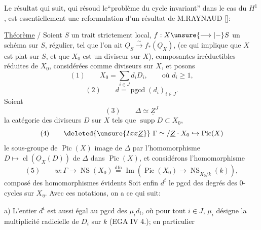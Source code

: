 

Le résultat qui suit, qui résoud le``problème du cycle invariant'' dans le cas du $H^1$, est essentiellement une reformulation d'un résultat de M.RAYNAUD [\quad]:
\margin{$\times$}

\uline{Théorème} / Soient $S$ un trait strictement local, $f:X\unsure{\longrightarrow|\mathbin{-}}S$ un schéma  sur $S$, régulier, tel que l'on ait $\underline{O}_S\xrightarrow{\sim}f_*(\underline{O}_X)$, (ce qui implique que $X$ est plat sur $S$, et que $X_0$ est un diviseur sur $X$),  composantes irréductibles réduites de $X_0$, considérées comme diviseurs sur $X$, et posons \unsure{$\times$}
\[
(1)\qquad X_0=\sum_{i\in J}d_iD_i,\qquad\text{où }d_i\geq1,
\]
\[
(2)\qquad d=\operatorname{pgcd}(d_i)_{i\in J}.
\]
Soient
\[
(3)\qquad\Delta\simeq\underline{Z}^{J}
\]
la catégorie des diviseurs $D$ sur $X$ tels que $\operatorname{supp}D\subset X_0$, 
\[
(4)\qquad\deleted{\unsure{Ixx\underline Z}}\ \Gamma\simeq/\underline Z\cdot X_0\hookrightarrow\operatorname{Pic}(X)
\]
le  sous-groupe de $\operatorname{Pic}(X)$ image de $\Delta$ par l'homomorphisme $D\mapsto\operatorname{cl}(\underline{O}_X(D))$ de $\Delta$ dans $\operatorname{Pic}(X)$, et considérons l'homomorphisme 
\[
(5)\qquad w:\Gamma\longrightarrow\operatorname{NS}(X_0)\overset{\mathrm{dfn}}{=}\operatorname{Im}(\operatorname{Pic}(X_0)\longrightarrow\underline{\operatorname{NS}}_{X_0/k}(k)),
\]
composé des homomorphismes évidents
Soit enfin $d^t$ le pgcd des degrés des 0-cycles sur $X_\eta$. Avec ces notations, on a ce qui suit:

a) L'entier $d^t$ est aussi égal au pgcd des $\mu_i d_i$, où pour tout $i\in J$, $\mu_i$ désigne la multiplicité radicielle de $D_i$ sur $k$ (EGA IV 4.\quad); en particulier 
\margin{$\times$}

